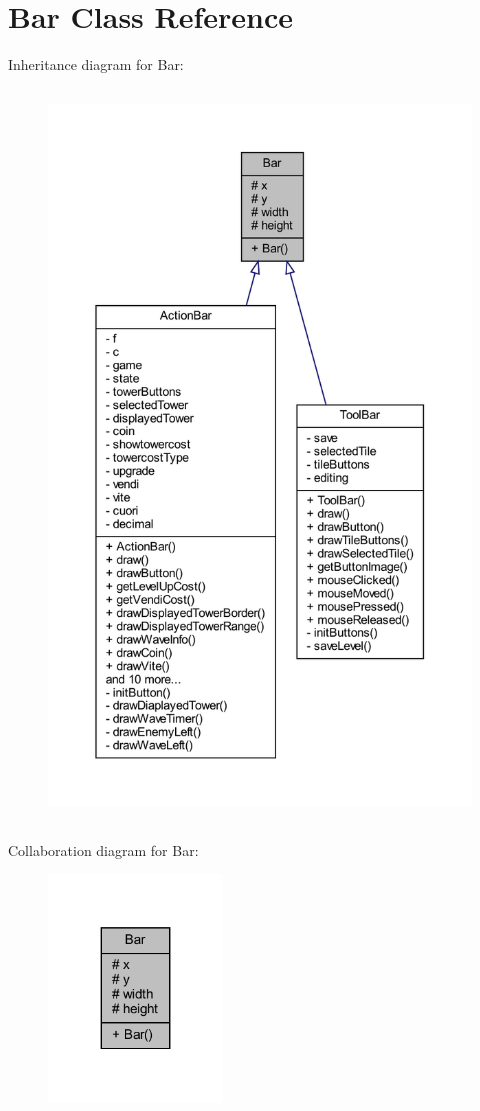 \hypertarget{classui_1_1_bar}{}\section{Bar Class Reference}
\label{classui_1_1_bar}


Inheritance diagram for Bar\+:\nopagebreak
\begin{figure}[H]
\begin{center}
\leavevmode
\includegraphics[height=550pt]{classui_1_1_bar__inherit__graph}
\end{center}
\end{figure}


Collaboration diagram for Bar\+:\nopagebreak
\begin{figure}[H]
\begin{center}
\leavevmode
\includegraphics[width=131pt]{classui_1_1_bar__coll__graph}
\end{center}
\end{figure}
